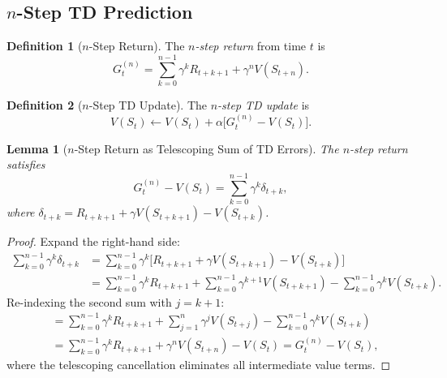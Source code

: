 \documentclass[11pt,a4paper]{article}
\theoremstyle{definition}
\newtheorem{definition}{Definition}[section]
\theoremstyle{plain}
\newtheorem{lemma}[theorem]{Lemma}
\theoremstyle{remark}
\begin{document}
\subsection{$n$-Step TD Prediction}
\label{subsec:nstep_td}

\begin{definition}[$n$-Step Return]
\label{def:nstep_return}
The \emph{$n$-step return} from time $t$ is
\begin{equation}
    G_t^{(n)} = \sum_{k=0}^{n-1} \gamma^k R_{t+k+1} + \gamma^n V(S_{t+n}).
    \label{eq:nstep_return}
\end{equation}
\end{definition}

\begin{definition}[$n$-Step TD Update]
\label{def:nstep_update}
The \emph{$n$-step TD update} is
\begin{equation}
    V(S_t) \leftarrow V(S_t) + \alpha\bigl[G_t^{(n)} - V(S_t)\bigr].
    \label{eq:nstep_update}
\end{equation}
\end{definition}

\begin{lemma}[$n$-Step Return as Telescoping Sum of TD Errors]
\label{lem:nstep_telescope}
The $n$-step return satisfies
\begin{equation}
    G_t^{(n)} - V(S_t) = \sum_{k=0}^{n-1} \gamma^k \delta_{t+k},
    \label{eq:nstep_telescope}
\end{equation}
where $\delta_{t+k} = R_{t+k+1} + \gamma V(S_{t+k+1}) - V(S_{t+k})$.
\end{lemma}

\begin{proof}
Expand the right-hand side:
\begin{align}
    \sum_{k=0}^{n-1} \gamma^k \delta_{t+k}
    &= \sum_{k=0}^{n-1} \gamma^k \bigl[R_{t+k+1} + \gamma V(S_{t+k+1}) - V(S_{t+k})\bigr] \nonumber\\
    &= \sum_{k=0}^{n-1} \gamma^k R_{t+k+1}
       + \sum_{k=0}^{n-1} \gamma^{k+1} V(S_{t+k+1})
       - \sum_{k=0}^{n-1} \gamma^k V(S_{t+k}). \label{eq:nstep_expand}
\end{align}
Re-indexing the second sum with $j = k+1$:
\begin{align}
    &= \sum_{k=0}^{n-1} \gamma^k R_{t+k+1}
       + \sum_{j=1}^{n} \gamma^j V(S_{t+j})
       - \sum_{k=0}^{n-1} \gamma^k V(S_{t+k}) \nonumber\\
    &= \sum_{k=0}^{n-1} \gamma^k R_{t+k+1}
       + \gamma^n V(S_{t+n}) - V(S_t)
    = G_t^{(n)} - V(S_t), \nonumber
\end{align}
where the telescoping cancellation eliminates all intermediate value terms.
\end{proof}
\end{document}
